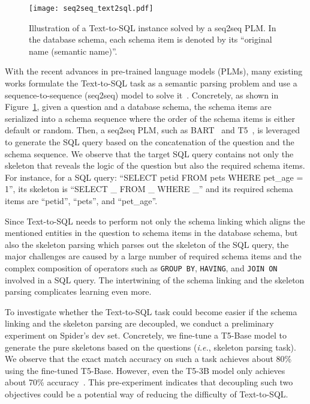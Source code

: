 \documentclass[letterpaper]{article} \usepackage{aaai23}  \usepackage{times}  \usepackage{helvet}  \usepackage{courier}  \usepackage[hyphens]{url}  \usepackage{graphicx} \urlstyle{rm} \def\UrlFont{\rm}  \usepackage{natbib}  \usepackage{caption} \frenchspacing  \setlength{\pdfpagewidth}{8.5in}  \setlength{\pdfpageheight}{11in}  \usepackage{algorithm}
\begin{document}
\begin{figure}[t]
    \centering	\texttt{[image: seq2seq\_text2sql.pdf]}
	\caption{\label{fig:example} Illustration of a Text-to-SQL instance solved by a seq2seq PLM. In the database schema, each schema item is denoted by its ``original name (semantic name)''.}
\end{figure}

With the recent advances in pre-trained language models (PLMs), many existing works formulate the Text-to-SQL task as a semantic parsing problem and use a sequence-to-sequence (seq2seq) model to solve it~\citep{torsten2021picard, peng2021learning, peter2021compositional}. Concretely, as shown in Figure~\ref{fig:example}, given a question and a database schema, the schema items are serialized into a schema sequence where the order of the schema items is either default or random. Then, a seq2seq PLM, such as BART~\citep{mike2020bart} and T5~\citep{colin2020t5}, is leveraged to generate the SQL query based on the concatenation of the question and the schema sequence. We observe that the target SQL query contains not only the skeleton that reveals the logic of the question but also the required schema items. For instance, for a SQL query: ``SELECT petid FROM pets WHERE pet\_age = 1'', its skeleton is ``SELECT \_ FROM \_ WHERE \_'' and its required schema items are ``petid'', ``pets'', and ``pet\_age''. 

Since Text-to-SQL needs to perform not only the schema linking which aligns the mentioned entities in the question to schema items in the database schema, but also the skeleton parsing which parses out the skeleton of the SQL query, the major challenges are caused by a large number of required schema items and the complex composition of operators such as \texttt{GROUP BY}, \texttt{HAVING}, and \texttt{JOIN ON} involved in a SQL query. The intertwining of the schema linking and the skeleton parsing complicates learning even more.

To investigate whether the Text-to-SQL task could become easier if the schema linking and the skeleton parsing are decoupled, we conduct a preliminary experiment on Spider's dev set. Concretely, we fine-tune a T5-Base model to generate the pure skeletons based on the questions (\emph{i.e.}, skeleton parsing task). We observe that the exact match accuracy on such a task achieves about 80\% using the fine-tuned T5-Base. However, even the T5-3B model only achieves about 70\% accuracy~\citep{peter2021compositional, torsten2021picard}. This pre-experiment indicates that decoupling such two objectives could be a potential way of reducing the difficulty of Text-to-SQL.
\end{document}
